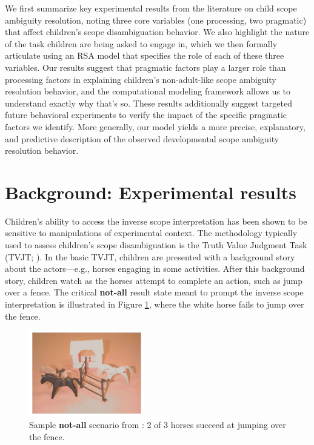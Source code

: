 \documentclass[10pt,a4paper]{article}
\newcommand{\gcs}[1]{\textcolor{blue}{[gcs: #1]}}
\newcommand{\lsp}[1]{\textcolor{violet}{[lsp: #1]}}
\begin{document}
We first summarize key experimental results from the literature on child scope ambiguity resolution, noting three core variables (one processing, two pragmatic) that affect children's scope disambiguation behavior. We also highlight the nature of the task children are being asked to engage in, 
which we then formally articulate using an RSA model that specifies the role of each of these three variables.
Our results suggest that pragmatic factors play a larger role than processing factors in explaining children's non-adult-like scope ambiguity resolution behavior, 
and the computational modeling framework allows us to understand exactly why that's so. %
These results additionally suggest targeted future behavioral experiments to verify the impact of the specific pragmatic factors we identify.  
More generally, our model yields a more precise, explanatory, and predictive description of the observed developmental scope ambiguity resolution behavior.


\section{Background: Experimental results}

Children's ability to access the inverse scope interpretation has been shown to be sensitive to manipulations of experimental context.
The methodology typically used to assess children's scope disambiguation is the Truth Value Judgment Task (TVJT; ).  In the basic TVJT, children are presented with a background story about the actors---e.g., horses engaging in some activities.  After this background story, children watch as the horses attempt to complete an action, such as jump over a fence. 
The critical \textbf{not-all} result state meant to prompt the inverse scope interpretation is illustrated in Figure \ref{fig:horse}, where the white horse fails to jump over the fence. 

\begin{figure}[!ht]
\begin{center}
\includegraphics[width=50mm,scale=0.5]{musolidz_horses_pic.JPG}
\caption{Sample \textbf{not-all} scenario from : 2 of 3 horses succeed at jumping over the fence.}
\label{fig:horse}
\end{center}
\end{figure}
\end{document}
